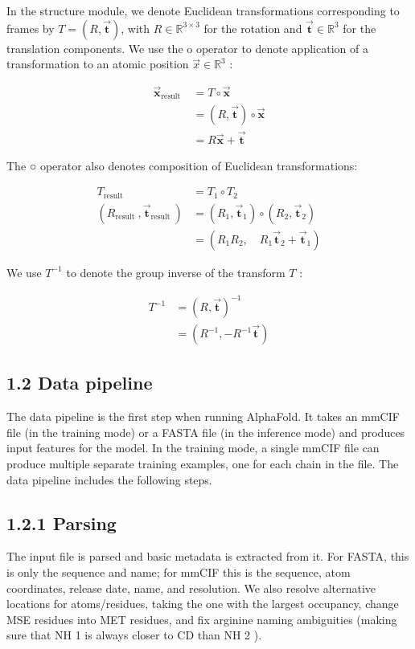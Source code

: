 \documentclass[10pt]{article}
\begin{document}
In the structure module, we denote Euclidean transformations corresponding to frames by $T=(R, \overrightarrow{\mathbf{t}})$, with $R \in \mathbb{R}^{3 \times 3}$ for the rotation and $\overrightarrow{\mathbf{t}} \in \mathbb{R}^{3}$ for the translation components. We use the o operator to denote application of a transformation to an atomic position $\vec{x} \in \mathbb{R}^{3}$ :

$$
\begin{aligned}
\overrightarrow{\mathbf{x}}_{\text {result }} & =T \circ \overrightarrow{\mathbf{x}} \\
& =(R, \overrightarrow{\mathbf{t}}) \circ \overrightarrow{\mathbf{x}} \\
& =R \overrightarrow{\mathbf{x}}+\overrightarrow{\mathbf{t}}
\end{aligned}
$$

The ○ operator also denotes composition of Euclidean transformations:

$$
\begin{aligned}
T_{\text {result }} & =T_{1} \circ T_{2} \\
\left(R_{\text {result }}, \overrightarrow{\mathbf{t}}_{\text {result }}\right) & =\left(R_{1}, \overrightarrow{\mathbf{t}}_{1}\right) \circ\left(R_{2}, \overrightarrow{\mathbf{t}}_{2}\right) \\
& =\left(R_{1} R_{2}, \quad R_{1} \overrightarrow{\mathbf{t}}_{2}+\overrightarrow{\mathbf{t}}_{1}\right)
\end{aligned}
$$

We use $T^{-1}$ to denote the group inverse of the transform $T$ :

$$
\begin{aligned}
T^{-1} & =(R, \overrightarrow{\mathbf{t}})^{-1} \\
& =\left(R^{-1},-R^{-1} \overrightarrow{\mathbf{t}}\right)
\end{aligned}
$$

\subsection*{1.2 Data pipeline}
The data pipeline is the first step when running AlphaFold. It takes an mmCIF file (in the training mode) or a FASTA file (in the inference mode) and produces input features for the model. In the training mode, a single mmCIF file can produce multiple separate training examples, one for each chain in the file. The data pipeline includes the following steps.

\subsection*{1.2.1 Parsing}
The input file is parsed and basic metadata is extracted from it. For FASTA, this is only the sequence and name; for mmCIF this is the sequence, atom coordinates, release date, name, and resolution. We also resolve alternative locations for atoms/residues, taking the one with the largest occupancy, change MSE residues into MET residues, and fix arginine naming ambiguities (making sure that NH 1 is always closer to CD than NH 2 ).
\end{document}
